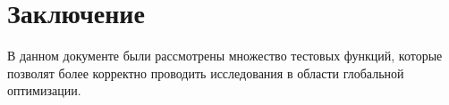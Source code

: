 \chapter*{Заключение}

В данном документе были рассмотрены множество тестовых функций, которые позволят более корректно проводить исследования в области глобальной оптимизации.

\clearpage